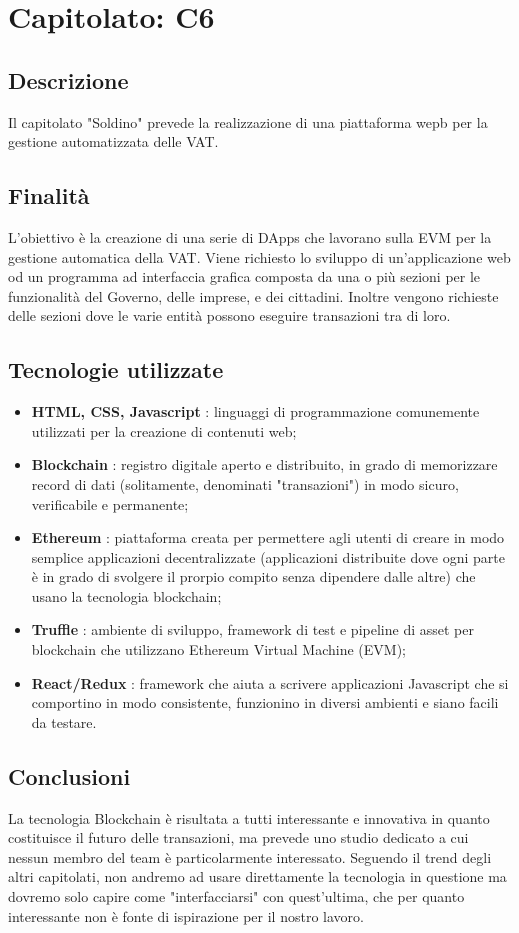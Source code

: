 \section{Capitolato: C6}
	\subsection{Descrizione}
		Il capitolato "Soldino" prevede la realizzazione di una piattaforma wepb per la gestione automatizzata delle VAT.
	\subsection{Finalità}
		L'obiettivo è la creazione di una serie di DApps che lavorano sulla EVM per la gestione automatica della VAT.
		Viene richiesto lo sviluppo di un'applicazione web od un programma ad interfaccia grafica composta da una o più sezioni per le funzionalità del Governo, delle imprese, e dei cittadini. Inoltre vengono richieste delle sezioni dove le varie entità possono eseguire transazioni tra di loro.
	\subsection{Tecnologie utilizzate}
		\begin{itemize}
			\item \textbf{HTML, CSS, Javascript} : linguaggi di programmazione comunemente utilizzati per la creazione di contenuti web;
			\item \textbf{Blockchain} : registro digitale aperto e distribuito, in grado di memorizzare record di dati (solitamente, denominati "transazioni") in modo sicuro, verificabile e permanente;
			\item \textbf{Ethereum} : piattaforma creata per permettere agli utenti di creare in modo semplice applicazioni decentralizzate (applicazioni distribuite dove ogni parte è in grado di svolgere il prorpio compito senza dipendere dalle altre) che usano la tecnologia blockchain;
			\item \textbf{Truffle} : ambiente di sviluppo, framework di test e pipeline di asset per blockchain che utilizzano Ethereum Virtual Machine (EVM);
			\item \textbf{React/Redux} : framework che aiuta a scrivere applicazioni Javascript che si comportino in modo consistente, funzionino in diversi ambienti e siano facili da testare.
		\end{itemize}
	\subsection{Conclusioni}
		La tecnologia Blockchain è risultata a tutti interessante e innovativa in quanto costituisce il futuro delle transazioni, ma prevede uno studio dedicato a cui nessun membro del team è particolarmente interessato. Seguendo il trend degli altri capitolati, non andremo ad usare direttamente la tecnologia in questione ma dovremo solo capire come "interfacciarsi" con quest'ultima, che per quanto interessante non è fonte di ispirazione per il nostro lavoro.